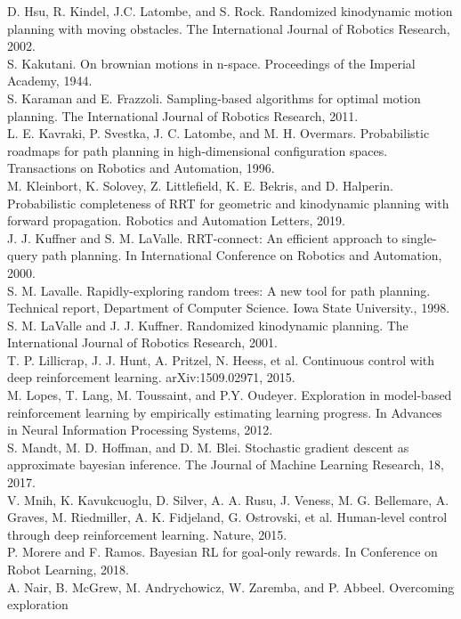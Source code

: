 \documentclass{article}
\newcounter{n}
\begin{document}
D. Hsu, R. Kindel, J.C. Latombe, and S. Rock. Randomized kinodynamic motion planning with
moving obstacles. The International Journal of Robotics Research, 2002.\\
S. Kakutani. On brownian motions in n-space. Proceedings of the Imperial Academy, 1944.\\
S. Karaman and E. Frazzoli. Sampling-based algorithms for optimal motion planning. The International Journal of Robotics Research, 2011.\\
L. E. Kavraki, P. Svestka, J. C. Latombe, and M. H. Overmars. Probabilistic roadmaps for path
planning in high-dimensional configuration spaces. Transactions on Robotics and Automation,
1996.\\
M. Kleinbort, K. Solovey, Z. Littlefield, K. E. Bekris, and D. Halperin. Probabilistic completeness of
RRT for geometric and kinodynamic planning with forward propagation. Robotics and Automation
Letters, 2019.\\
J. J. Kuffner and S. M. LaValle. RRT-connect: An efficient approach to single-query path planning.
In International Conference on Robotics and Automation, 2000.\\
S. M. Lavalle. Rapidly-exploring random trees: A new tool for path planning. Technical report,
Department of Computer Science. Iowa State University., 1998.\\
S. M. LaValle and J. J. Kuffner. Randomized kinodynamic planning. The International Journal of
Robotics Research, 2001.\\
T. P. Lillicrap, J. J. Hunt, A. Pritzel, N. Heess, et al. Continuous control with deep reinforcement
learning. arXiv:1509.02971, 2015.\\
M. Lopes, T. Lang, M. Toussaint, and P.Y. Oudeyer. Exploration in model-based reinforcement
learning by empirically estimating learning progress. In Advances in Neural Information Processing
Systems, 2012.\\
S. Mandt, M. D. Hoffman, and D. M. Blei. Stochastic gradient descent as approximate bayesian
inference. The Journal of Machine Learning Research, 18, 2017.\\
V. Mnih, K. Kavukcuoglu, D. Silver, A. A. Rusu, J. Veness, M. G. Bellemare, A. Graves, M. Riedmiller, A. K. Fidjeland, G. Ostrovski, et al. Human-level control through deep reinforcement
learning. Nature, 2015.\\
P. Morere and F. Ramos. Bayesian RL for goal-only rewards. In Conference on Robot Learning,
2018.\\
A. Nair, B. McGrew, M. Andrychowicz, W. Zaremba, and P. Abbeel. Overcoming exploration
\end{document}
